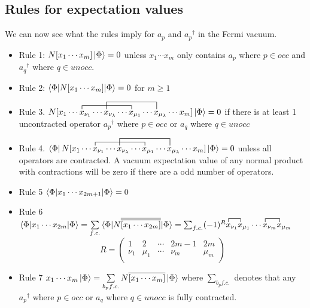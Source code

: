 \documentclass{article}
\newcommand{\ol}{\overline}
\newcommand{\fctr}{\contraction}
\newcommand{\kphi}{\ensuremath{\ket{\Phi}} }
\newcommand{\dg}{\ensuremath{^\dagger} }
\newcommand{\cd}{\ensuremath{\cdots} }
\begin{document}
\subsection{Rules for expectation values}
We can now see what the rules imply for $a_p$ and $a_p\dg$ in the Fermi vacuum. 
\begin{itemize}
\item Rule 1: $N[x_1 \cd x_m]\kphi = 0$ unless $x_1 \cd x_m$ only contains $a_p$ where $p \in occ$ and $a_q\dg$ where $q \in unocc$.
\item Rule 2: $\braket{\Phi | N[x_1 \cd x_m] | \Phi} = 0$ for  $m \geq 1$ \\
\item Rule 3. $\fctr{N[x_1 \cd }{x}{{}_{\nu_1} \cd x_{\nu_\lambda} \cd }{x}
\fctr[2ex]{N[x_1 \cd x_{\nu_1} \cd}{ x}{{}_{\nu_\lambda} \cd x_{\mu_1} \cd }{x} 
N[x_1 \cd x_{\nu_1} \cd x_{\nu_\lambda} \cd x_{\mu_1} \cd x_{\mu_\lambda} \cd x_m] \kphi= 0$ if there is at least 1 uncontracted 
operator $a_p\dg$ where $p \in occ$ or $a_q$ where $q \in unocc$  \\
\item Rule 4. $\bra{\Phi}\fctr{N[x_1 \cd }{x}{{}_{\nu_1} \cd x_{\nu_\lambda} \cd }{x}
\fctr[2ex]{N[x_1 \cd x_{\nu_1} \cd}{ x}{{}_{\nu_\lambda} \cd x_{\mu_1} \cd }{x} 
N[x_1 \cd x_{\nu_1} \cd x_{\nu_\lambda} \cd x_{\mu_1} \cd x_{\mu_\lambda} \cd x_m] \kphi= 0$ unless all operators are contracted.
A vacuum expectation value of any normal product with contractions will be zero if there are a odd number of operators. \\

\item Rule 5 $\braket{\Phi | x_1 \cd x_{2m + 1} | \Phi} = 0 $ \\

\item Rule 6 $\braket{\Phi | x_1 \cd x_{2m } | \Phi} = \sum\limits_{f.c.} \braket{\Phi | N\ol{\ol{ [x_1 \cd x_{2m }]}}| \Phi} = \sum_{f.c.} (-1)^R 
\fctr{}{x}{{}_{\nu_1}}{x} x_{\nu_1} x_{\mu_1} \cd \fctr{}{x}{{}_{\nu_m}}{x} x_{\nu_m} x_{\mu_m}$\\

\begin{equation*}
R = 
\begin{pmatrix}
1 & 2 &\cd  & 2m - 1 & 2m  \\
\nu_1 & \mu_1 & \cd  & \nu_m & \mu_m \\
\end{pmatrix}
\end{equation*}

\item Rule 7  $x_1 \cd x_m \kphi = \sum\limits_{b_p f.c.} N\ol{[ x_1 \cd x_m]}\kphi$
where $ \sum\limits_{b_p f.c.}$ denotes that any $a_p\dg$ where $p \in occ$ or $a_q$ where $q \in unocc$ is fully contracted.
\end{itemize}
\end{document}
